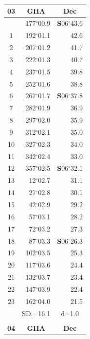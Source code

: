 \documentclass[10pt, a4paper]{report}
\begin{document}
\begin{scriptsize}
\noindent
\begin{tabular*}{0.2\textwidth}[t]{@{\extracolsep{\fill}}|c|rr|}
\hline
\multicolumn{1}{|c|}{\rule{0pt}{2.6ex}\textbf{03}} & \multicolumn{1}{c}{\textbf{GHA}} & \multicolumn{1}{c|}{\textbf{Dec}}\\
\hline\rule{0pt}{2.6ex}\noindent
0 & 177$^\circ$00.9 & \textbf{S}06$^\circ$43.6\\
1 & 192$^\circ$01.1 & 42.6\\
2 & 207$^\circ$01.2 & 41.7\\
3 & 222$^\circ$01.3 & \raisebox{0.24ex}{\boldmath$\cdot$~\boldmath$\cdot$~~}40.7\\
4 & 237$^\circ$01.5 & 39.8\\
5 & 252$^\circ$01.6 & 38.8\\[2Pt]
6 & 267$^\circ$01.7 & \textbf{S}06$^\circ$37.8\\
7 & 282$^\circ$01.9 & 36.9\\
8 & 297$^\circ$02.0 & 35.9\\
9 & 312$^\circ$02.1 & \raisebox{0.24ex}{\boldmath$\cdot$~\boldmath$\cdot$~~}35.0\\
10 & 327$^\circ$02.3 & 34.0\\
11 & 342$^\circ$02.4 & 33.0\\[2Pt]
12 & 357$^\circ$02.5 & \textbf{S}06$^\circ$32.1\\
13 & 12$^\circ$02.7 & 31.1\\
14 & 27$^\circ$02.8 & 30.1\\
15 & 42$^\circ$02.9 & \raisebox{0.24ex}{\boldmath$\cdot$~\boldmath$\cdot$~~}29.2\\
16 & 57$^\circ$03.1 & 28.2\\
17 & 72$^\circ$03.2 & 27.3\\[2Pt]
18 & 87$^\circ$03.3 & \textbf{S}06$^\circ$26.3\\
19 & 102$^\circ$03.5 & 25.3\\
20 & 117$^\circ$03.6 & 24.4\\
21 & 132$^\circ$03.7 & \raisebox{0.24ex}{\boldmath$\cdot$~\boldmath$\cdot$~~}23.4\\
22 & 147$^\circ$03.9 & 22.4\\
23 & 162$^\circ$04.0 & 21.5\\
\hline
\rule{0pt}{2.4ex} & \multicolumn{1}{c}{SD.=16.1} & \multicolumn{1}{c|}{d=1.0}\\
\hline
\multicolumn{1}{c}{}\\[-0.5ex]\hline
\multicolumn{1}{|c|}{\rule{0pt}{2.6ex}\textbf{04}} & \multicolumn{1}{c}{\textbf{GHA}} & \multicolumn{1}{c|}{\textbf{Dec}}\\

\end{tabular*}
\end{scriptsize}
\end{document}
